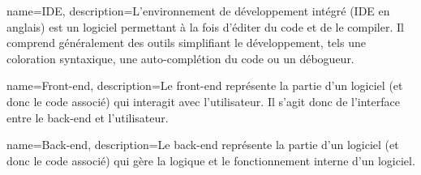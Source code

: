 {
	name=IDE,
	description={L'environnement de développement intégré (IDE en anglais) est un logiciel permettant à la fois d'éditer du code et de le compiler. Il comprend généralement des outils simplifiant le développement, tels une coloration syntaxique, une auto-complétion du code ou un débogueur.}
}

{
	name=Front-end,
	description={Le front-end représente la partie d'un logiciel (et donc le code associé) qui interagit avec l'utilisateur. Il s'agit donc de l'interface entre le back-end et l'utilisateur.}
}

{
	name=Back-end,
	description={Le back-end représente la partie d'un logiciel (et donc le code associé) qui gère la logique et le fonctionnement interne d'un logiciel.}
}

